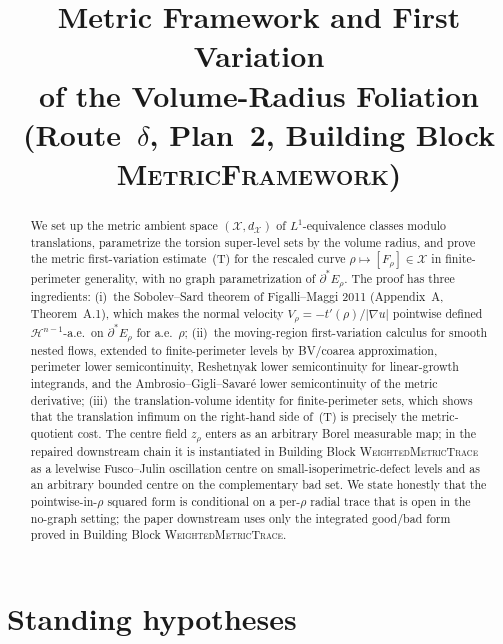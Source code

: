 \documentclass[11pt]{article}
\title{Metric Framework and First Variation\\
       of the Volume-Radius Foliation\\
       (Route~$\delta$, Plan~2, Building Block \textsc{MetricFramework})}
\author{}
\date{}
\theoremstyle{definition}
\newcommand{\X}{\mathcal X}
\begin{document}
\maketitle

\begin{abstract}
We set up the metric ambient space $(\X,d_\X)$ of $L^1$-equivalence classes
modulo translations, parametrize the torsion super-level sets by the volume
radius, and prove the metric first-variation estimate~(T) for the rescaled
curve $\rho\mapsto[F_\rho]\in\X$ in finite-perimeter generality, with no
graph parametrization of $\partial^*E_\rho$. The proof has three ingredients:
(i)~the Sobolev--Sard theorem of Figalli--Maggi 2011 (Appendix~A, Theorem~A.1),
which makes the normal velocity $V_\rho=-t'(\rho)/|\nabla u|$ pointwise
defined $\mathcal H^{n-1}$-a.e.\ on $\partial^*E_\rho$ for a.e.~$\rho$;
(ii)~the moving-region first-variation calculus for smooth nested flows,
extended to finite-perimeter levels by BV/coarea approximation, perimeter
lower semicontinuity, Reshetnyak lower semicontinuity for linear-growth
integrands, and the Ambrosio--Gigli--Savar\'e lower semicontinuity of the
metric derivative; (iii)~the translation-volume identity for finite-perimeter
sets, which shows that the translation infimum on the right-hand side of~(T)
is precisely the metric-quotient cost. The centre field $z_\rho$ enters as
an arbitrary Borel measurable map; in the repaired downstream chain it is
instantiated in Building Block \textsc{WeightedMetricTrace} as a levelwise
Fusco--Julin oscillation centre on small-isoperimetric-defect levels and as
an arbitrary bounded centre on the complementary bad set. We state honestly
that the pointwise-in-$\rho$ squared form is conditional on a per-$\rho$
radial trace that is open in the no-graph setting; the paper downstream uses
only the integrated good/bad form proved in Building Block
\textsc{WeightedMetricTrace}.
\end{abstract}

\section{Standing hypotheses}\label{sec:setup}
\end{document}
